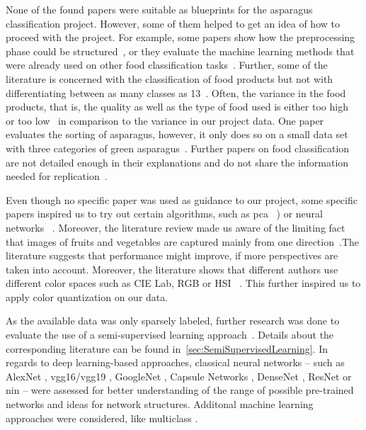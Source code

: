 \bigskip
None of the found papers were suitable as blueprints for the asparagus classification project. However, some of them helped to get an idea of how to proceed with the project. For example, some papers show how the preprocessing phase could be structured~\citep{mery2013automated}, or they evaluate the machine learning methods that were already used on other food classification tasks~\citep{bhargava2018fruits}. Further, some of the literature is concerned with the classification of food products but not with differentiating between as many classes as 13~\citep{diaz2004comparison,kilicc2007classification}. Often, the variance in the food products, that is, the quality as well as the type of food used is either too high~\citep{zhang2012classification} or too low~\citep{kilicc2007classification,al2011dates} in comparison to the variance in our project data. One paper evaluates the sorting of asparagus, however, it only does so on a small data set with three categories of green asparagus~\citep{donis2016classification}. Further papers on food classification are not detailed enough in their explanations and do not share the information needed for replication~\citep{pedreschi2016grading}.

Even though no specific paper was used as guidance to our project, some specific papers inspired us to try out certain algorithms, such as \acrshort{pca} ~\citep{Vijayarekha2008, Zhu2007}) or neural networks ~\citep{Jhuria2013, Pujari2014}. Moreover, the literature review made us aware of the limiting fact that images of fruits and vegetables are captured mainly from one direction~\citep{bhargava2018fruits}.The literature suggests that performance might improve, if more perspectives are taken into account. Moreover, the literature shows that different authors use different color spaces such as CIE Lab, RGB or HSI ~\citep{Liming2010, Garrido-Novell2012, Kondo2010}. This further inspired us to apply color quantization on our data.

\bigbreak
As the available data was only sparsely labeled, further research was done to evaluate the use of a semi-supervised learning approach~\citep{olivier2006semi,zhu05survey}. Details about the corresponding literature can be found in~\autoref{sec:SemiSupervisedLearning}. In regards to deep learning-based approaches, classical neural networks -- such as AlexNet \citep{alexnet2012original}, \acrshort{vgg}16/\acrshort{vgg}19 \citep{vgg2014original}, GoogleNet \citep{googlenet2015original}, Capsule Networks \citep{capsulenet2017original},  DenseNet \citep{densenet2017original}, ResNet \citep{resnet2016original} or \acrfull{nin} \citep{lin2013network} -- were assessed for better understanding of the range of possible pre-trained networks and ideas for network structures. Additonal machine learning approaches were considered, like multiclass  \citep{prakash2012multi}.
